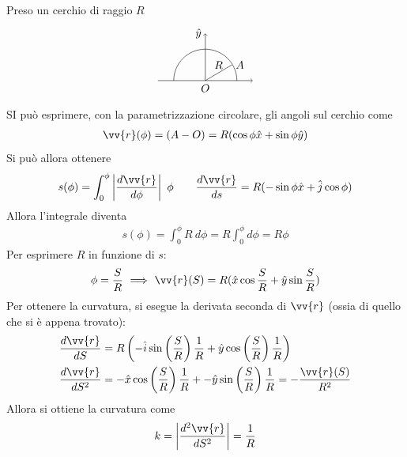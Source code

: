 \documentclass[a4paper, oneside]{article}
\begin{document}
\begin{example}
    Preso un cerchio di raggio $R$
    \begin{gather*}
        \begin{tikzpicture}
            \draw(-1, 0) arc (180:0:1);
            \draw[->](-1.5, 0) -- (1.5, 0); 
            \draw[->](0, 0) -- (0, 1.5) node[at end, left] {$\hat{y}$ };
            \draw(0, 0) -- (0.84, 0.5) node[midway, above] {$R$};
            \filldraw(0, 0) node[anchor = north] {$O$};
            \filldraw(0.84, 0.5) node[anchor = west] {$A$};
        \end{tikzpicture}
    \end{gather*}
    SI può esprimere, con la parametrizzazione circolare, gli angoli sul cerchio come 
    \begin{gather*}
        \vv{r}(\phi)  = (A - O) = R(\cos\phi \hat{x} + \sin\phi \hat{y}  )
    \end{gather*}
    Si può allora ottenere 
    \begin{gather*}
        s(\phi) = \int_{0}^{\phi} \left| \frac{d\vv{r} }{d\phi}  \right| \ \phi  \qquad \frac{d\vv{r} }{ds} =  R(-\sin\phi \hat{x} + \hat{j} \cos\phi  ) 
    \end{gather*}
    Allora l'integrale diventa
    \begin{gather*}
        s(\phi) = \int_{0}^{\phi} R \ d\phi = R\int_{0}^{\phi} d\phi = R\phi  
    \end{gather*}
    Per esprimere $R$ in funzione di $s$: 
    \begin{gather*}
        \phi = \frac{S}{R} \ \Longrightarrow \ \vv{r}(S) = R(\hat{x} \cos\frac{S}{R} + \hat{y} \sin\frac{S}{R}  ) 
    \end{gather*}
    Per ottenere la curvatura, si esegue la derivata seconda di $\vv{r}$ (ossia
    di quello che si è appena trovato):
    \begin{align*}
        \frac{d\vv{r} }{dS} &= R\left(-\hat{i}\sin\left(\frac{S}{R}\right) \frac{1}{R} + \hat{y} \cos\left(\frac{S}{R}\right) \frac{1}{R}  \right) \\
        \frac{d\vv{r} }{dS^{2}} &= -\hat{x}\cos\left(\frac{S}{R}\right) \frac{1}{R} + -\hat{y}\sin\left(\frac{S}{R} \right) \frac{1}{R}    = - \frac{\vv{r}(S) }{R^{2}}
    \end{align*} 
    Allora si ottiene la curvatura come 
    \begin{gather*}
        k = \left| \frac{d^{2}\vv{r} }{dS^{2}} \right|  = \frac{1}{R}
    \end{gather*}
\end{example}
\end{document}

